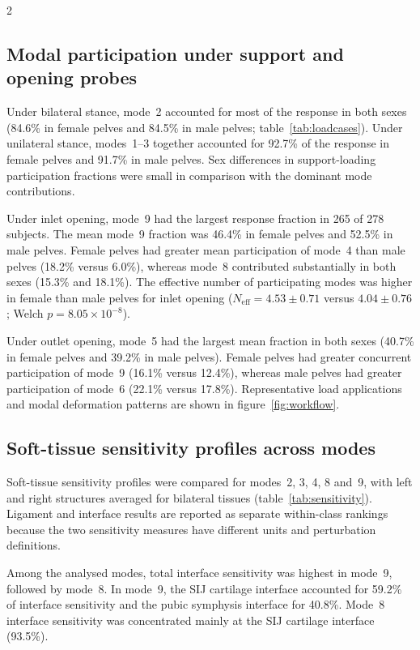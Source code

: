 \documentclass[openacc]{rsproca_new}
\begin{document}
\begin{multicols}{2}
\subsection{Modal participation under support and opening probes}

Under bilateral stance, mode~2 accounted for most of the response in both sexes (84.6\% in female pelves and 84.5\% in male pelves; table~\ref{tab:loadcases}). Under unilateral stance, modes~1--3 together accounted for 92.7\% of the response in female pelves and 91.7\% in male pelves. Sex differences in support-loading participation fractions were small in comparison with the dominant mode contributions.

Under inlet opening, mode~9 had the largest response fraction in 265 of 278 subjects. The mean mode~9 fraction was 46.4\% in female pelves and 52.5\% in male pelves. Female pelves had greater mean participation of mode~4 than male pelves (18.2\% versus 6.0\%), whereas mode~8 contributed substantially in both sexes (15.3\% and 18.1\%). The effective number of participating modes was higher in female than male pelves for inlet opening ($N_{\mathrm{eff}}=4.53\pm0.71$ versus $4.04\pm0.76$; Welch $p=8.05\times10^{-8}$).

Under outlet opening, mode~5 had the largest mean fraction in both sexes (40.7\% in female pelves and 39.2\% in male pelves). Female pelves had greater concurrent participation of mode~9 (16.1\% versus 12.4\%), whereas male pelves had greater participation of mode~6 (22.1\% versus 17.8\%). Representative load applications and modal deformation patterns are shown in figure~\ref{fig:workflow}.

\subsection{Soft-tissue sensitivity profiles across modes}

Soft-tissue sensitivity profiles were compared for modes~2, 3, 4, 8 and~9, with left and right structures averaged for bilateral tissues (table~\ref{tab:sensitivity}). Ligament and interface results are reported as separate within-class rankings because the two sensitivity measures have different units and perturbation definitions.

Among the analysed modes, total interface sensitivity was highest in mode~9, followed by mode~8. In mode~9, the SIJ cartilage interface accounted for 59.2\% of interface sensitivity and the pubic symphysis interface for 40.8\%. Mode~8 interface sensitivity was concentrated mainly at the SIJ cartilage interface (93.5\%).


\end{multicols}
\end{document}
